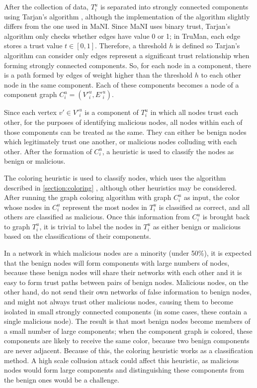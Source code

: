 After the collection of data, $T^u_i$ is separated into strongly connected components using Tarjan's algorithm \citep{tarjan1972depth}, although the implementation of the algorithm slightly differs from the one used in MaNI.
Since MaNI uses binary trust, Tarjan's algorithm only checks whether edges have value 0 or 1; in TruMan, each edge stores a trust value $t \in [0, 1]$.%
Therefore, a threshold $h$ is defined so Tarjan's algorithm can consider only edges represent a significant trust relationship when forming strongly connected components.
So, for each node in a component, there is a path formed by edges of weight higher than the threshold $h$ to each other node in the same component.
Each of these components becomes a node of a component graph $C^u_i = (V'^u_i, E'^u_i)$.

Since each vertex $v' \in V'^u_i$ is a component of $T^u_i$ in which all nodes trust each other, for the purposes of identifying malicious nodes, all nodes within each of those components can be treated as the same.
They can either be benign nodes which legitimately trust one another, or malicious nodes colluding with each other.
After the formation of $C^u_i$, a heuristic is used to classify the nodes as benign or malicious.

The coloring heuristic is used to classify nodes, which uses the algorithm described in \autoref{section:coloring} \citep{mittal2011graph}, although other heuristics may be considered.
After running the graph coloring algorithm with graph $C^u_i$ as input, the color whose nodes in $C^u_i$ represent the most nodes in $T^u_i$ is classified as correct, and all others are classified as malicious.
Once this information from $C^u_i$ is brought back to graph $T^u_i$, it is trivial to label the nodes in $T^u_i$ as either benign or malicious based on the classifications of their components.

In a network in which malicious nodes are a minority (under 50\%), it is expected that the benign nodes will form components with large numbers of nodes, because these benign nodes will share their networks with each other and it is easy to form trust paths between pairs of benign nodes.
Malicious nodes, on the other hand, do not send their own networks of false information to benign nodes, and might not always trust other malicious nodes, causing them to become isolated in small strongly connected components (in some cases, these contain a single malicious node).
The result is that most benign nodes become members of a small number of large components; when the component graph is colored, these components are likely to receive the same color, because two benign components are never adjacent.
Because of this, the coloring heuristic works as a classification method.
A high scale collusion attack could affect this heuristic, as malicious nodes would form large components and distinguishing these components from the benign ones would be a challenge.

